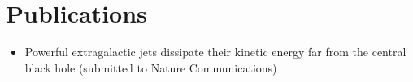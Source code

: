 %
%
%

\section{\texorpdfstring{\color{Blue}Publications}{Publications}}

\begin{itemize}
    \item Powerful extragalactic jets dissipate their kinetic energy far from the central black hole (submitted to Nature Communications)
\end{itemize}

